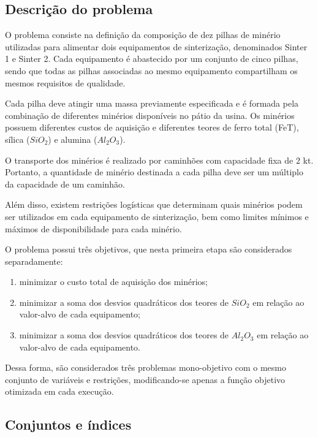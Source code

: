 \documentclass[12pt,a4paper]{article}
\begin{document}
\subsection{Descrição do problema}

O problema consiste na definição da composição de dez pilhas de minério
utilizadas para alimentar dois equipamentos de sinterização, denominados
Sinter 1 e Sinter 2. Cada equipamento é abastecido por um conjunto de cinco
pilhas, sendo que todas as pilhas associadas ao mesmo equipamento compartilham
os mesmos requisitos de qualidade.

Cada pilha deve atingir uma massa previamente especificada e é formada pela
combinação de diferentes minérios disponíveis no pátio da usina. Os minérios
possuem diferentes custos de aquisição e diferentes teores de ferro total
(FeT), sílica ($SiO_2$) e alumina ($Al_2O_3$).

O transporte dos minérios é realizado por caminhões com capacidade fixa de
$2$ kt. Portanto, a quantidade de minério destinada a cada pilha deve ser um
múltiplo da capacidade de um caminhão.

Além disso, existem restrições logísticas que determinam quais minérios podem
ser utilizados em cada equipamento de sinterização, bem como limites mínimos
e máximos de disponibilidade para cada minério.

O problema possui três objetivos, que nesta primeira etapa são considerados
separadamente:

\begin{enumerate}
    \item minimizar o custo total de aquisição dos minérios;
    \item minimizar a soma dos desvios quadráticos dos teores de $SiO_2$
    em relação ao valor-alvo de cada equipamento;
    \item minimizar a soma dos desvios quadráticos dos teores de $Al_2O_3$
    em relação ao valor-alvo de cada equipamento.
\end{enumerate}

Dessa forma, são considerados três problemas mono-objetivo com o mesmo
conjunto de variáveis e restrições, modificando-se apenas a função objetivo
otimizada em cada execução.



\subsection{Conjuntos e índices}
\end{document}
